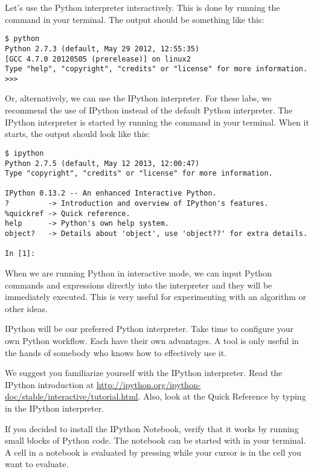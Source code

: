 Let's use the Python interpreter interactively.
This is done by running the command  in your terminal.
The output should be something like this:
\begin{lstlisting}
$ python
Python 2.7.3 (default, May 29 2012, 12:55:35)
[GCC 4.7.0 20120505 (prerelease)] on linux2
Type "help", "copyright", "credits" or "license" for more information.
>>>
\end{lstlisting}
Or, alternatively, we can use the IPython interpreter.
For these labs, we recommend the use of IPython instead of the default Python interpreter.
The IPython interpreter is started by running the command  in your terminal.
When it starts, the output should look like this:
\begin{lstlisting}
$ ipython
Python 2.7.5 (default, May 12 2013, 12:00:47)
Type "copyright", "credits" or "license" for more information.

IPython 0.13.2 -- An enhanced Interactive Python.
?         -> Introduction and overview of IPython's features.
%quickref -> Quick reference.
help      -> Python's own help system.
object?   -> Details about 'object', use 'object??' for extra details.

In [1]:
\end{lstlisting}
When we are running Python in interactive mode, we can input Python commands and expressions 
directly into the interpreter and they will be immediately executed.
This is very useful for experimenting with an algorithm or other ideas.

IPython will be our preferred Python interpreter.  Take time to configure your own Python
workflow.  Each have their own advantages.  A tool is only useful in the hands of somebody
who knows how to effectively use it.

We suggest you familiarize yourself with the IPython interpreter.
Read the IPython introduction at \url{http://ipython.org/ipython-doc/stable/interactive/tutorial.html}.
Also, look at the Quick Reference by typing  in the IPython interpreter.

If you decided to install the IPython Notebook, verify that it works by running small blocks of Python code.
The notebook can be started with  in your terminal.
A cell in a notebook is evaluated by pressing  while your cursor is in the cell you want to evaluate.

